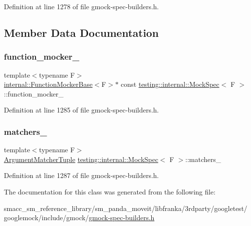 Definition at line 1278 of file gmock-\/spec-\/builders.\+h.



\subsection{Member Data Documentation}
\mbox{\label{classtesting_1_1internal_1_1MockSpec_a9dafaf30cc5ecfe824d1b92949e2054a}} 
\subsubsection{\texorpdfstring{function\+\_\+mocker\+\_\+}{function\_mocker\_}}
{\footnotesize\ttfamily template$<$typename F$>$ \\
\hyperlink{classtesting_1_1internal_1_1FunctionMockerBase}{internal\+::\+Function\+Mocker\+Base}$<$F$>$$\ast$ const \hyperlink{classtesting_1_1internal_1_1MockSpec}{testing\+::internal\+::\+Mock\+Spec}$<$ F $>$\+::function\+\_\+mocker\+\_\+\hspace{0.3cm}{\ttfamily [private]}}



Definition at line 1285 of file gmock-\/spec-\/builders.\+h.

\mbox{\label{classtesting_1_1internal_1_1MockSpec_acb32a52e9244cfc33601de0fcc96aa2f}} 
\subsubsection{\texorpdfstring{matchers\+\_\+}{matchers\_}}
{\footnotesize\ttfamily template$<$typename F$>$ \\
\hyperlink{classtesting_1_1internal_1_1MockSpec_a35dc5836483cb8c6882c365c447b26cd}{Argument\+Matcher\+Tuple} \hyperlink{classtesting_1_1internal_1_1MockSpec}{testing\+::internal\+::\+Mock\+Spec}$<$ F $>$\+::matchers\+\_\+\hspace{0.3cm}{\ttfamily [private]}}



Definition at line 1287 of file gmock-\/spec-\/builders.\+h.



The documentation for this class was generated from the following file\+:\begin{DoxyCompactItemize}
\item 
smacc\+\_\+sm\+\_\+reference\+\_\+library/sm\+\_\+panda\+\_\+moveit/libfranka/3rdparty/googletest/googlemock/include/gmock/\hyperlink{gmock-spec-builders_8h}{gmock-\/spec-\/builders.\+h}\end{DoxyCompactItemize}
